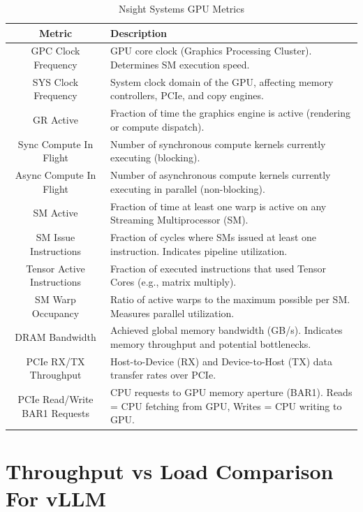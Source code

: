 \begin{table}[h]
\centering
\renewcommand{\arraystretch}{1.3}
\begin{tabular}{|c|p{8cm}|}
\hline
\textbf{Metric} & \textbf{Description} \\ \hline
GPC Clock Frequency & GPU core clock (Graphics Processing Cluster). Determines SM execution speed. \\ \hline
SYS Clock Frequency & System clock domain of the GPU, affecting memory controllers, PCIe, and copy engines. \\ \hline
GR Active & Fraction of time the graphics engine is active (rendering or compute dispatch). \\ \hline
Sync Compute In Flight & Number of synchronous compute kernels currently executing (blocking). \\ \hline
Async Compute In Flight & Number of asynchronous compute kernels currently executing in parallel (non-blocking). \\ \hline
SM Active & Fraction of time at least one warp is active on any Streaming Multiprocessor (SM). \\ \hline
SM Issue Instructions & Fraction of cycles where SMs issued at least one instruction. Indicates pipeline utilization. \\ \hline
Tensor Active Instructions & Fraction of executed instructions that used Tensor Cores (e.g., matrix multiply). \\ \hline
SM Warp Occupancy & Ratio of active warps to the maximum possible per SM. Measures parallel utilization. \\ \hline
DRAM Bandwidth & Achieved global memory bandwidth (GB/s). Indicates memory throughput and potential bottlenecks. \\ \hline
PCIe RX/TX Throughput & Host-to-Device (RX) and Device-to-Host (TX) data transfer rates over PCIe. \\ \hline
PCIe Read/Write BAR1 Requests & CPU requests to GPU memory aperture (BAR1). Reads = CPU fetching from GPU, Writes = CPU writing to GPU. \\ \hline
\end{tabular}
\caption{Nsight Systems GPU Metrics}
\label{tab:nsys_metrics}
\end{table}


\clearpage

\section{Throughput vs Load Comparison For vLLM}

